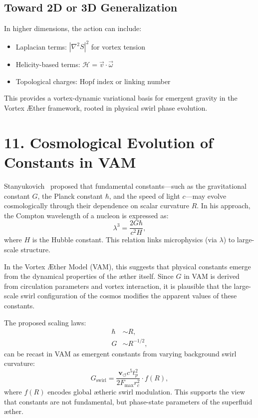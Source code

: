 \documentclass[11pt]{article}
\begin{document}
\subsection*{Toward 2D or 3D Generalization}

In higher dimensions, the action can include:
\begin{itemize}
\item Laplacian terms: $|\nabla^2 S|^2$ for vortex tension
\item Helicity-based terms: $\mathcal{H} = \vec{v} \cdot \vec{\omega}$
\item Topological charges: Hopf index or linking number
\end{itemize}

This provides a vortex-dynamic variational basis for emergent gravity in the Vortex \AE ther framework, rooted in physical swirl phase evolution.

\section*{11. Cosmological Evolution of Constants in VAM}

Stanyukovich~\cite{stanyukovich2008evolution} proposed that fundamental constants—such as the gravitational constant $G$, the Planck constant $\hbar$, and the speed of light $c$—may evolve cosmologically through their dependence on scalar curvature $R$. In his approach, the Compton wavelength of a nucleon is expressed as:
\begin{equation}
\lambda^3 = \frac{2G\hbar}{c^2 H},
\end{equation}
where $H$ is the Hubble constant. This relation links microphysics (via $\lambda$) to large-scale structure.

In the Vortex \AE ther Model (VAM), this suggests that physical constants emerge from the dynamical properties of the æther itself. Since $G$ in VAM is derived from circulation parameters and vortex interaction, it is plausible that the large-scale swirl configuration of the cosmos modifies the apparent values of these constants.

The proposed scaling laws:
\begin{align*}
\hbar &\sim R, \\
G &\sim R^{-1/2},
\end{align*}
can be recast in VAM as emergent constants from varying background swirl curvature:
\begin{equation}
G_\text{swirl} = \frac{\mathbf{v}_{\scriptscriptstyle\boldsymbol{\circlearrowleft}} c^5 t_p^2}{2 F_\text{max} r_c^2} \cdot f(R),
\end{equation}
where $f(R)$ encodes global ætheric swirl modulation. This supports the view that constants are not fundamental, but phase-state parameters of the superfluid æther.
\end{document}
